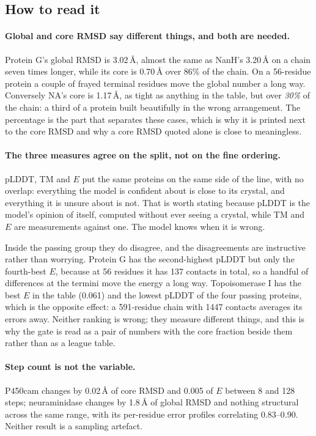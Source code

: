 \documentclass[11pt,a4paper]{article}
\begin{document}
\subsection{How to read it}

\paragraph{Global and core RMSD say different things, and both are needed.}
Protein G's global RMSD is 3.02\,\AA, almost the same as NanH's 3.20\,\AA{} on
a chain seven times longer, while its core is 0.70\,\AA{} over 86\% of the
chain. On a
56-residue protein a couple of frayed terminal residues move the global number a
long way. Conversely NA's core is 1.17\,\AA, as tight as anything in the table,
but over \emph{30\%} of the chain: a third of a protein built beautifully in the
wrong arrangement. The percentage is the part that separates these cases, which
is why it is printed next to the core RMSD and why a core RMSD quoted alone is
close to meaningless.

\paragraph{The three measures agree on the split, not on the fine ordering.}
pLDDT, TM and $E$ put the same proteins on the same side of the line, with no
overlap: everything the model is confident about is close to its crystal, and
everything it is unsure about is not. That is worth stating because pLDDT is the
model's opinion of itself, computed without ever seeing a crystal, while TM and
$E$ are measurements against one. The model knows when it is wrong.

Inside the passing group they do disagree, and the disagreements are
instructive rather than worrying. Protein G has the second-highest pLDDT but
only the fourth-best $E$, because at 56 residues it has 137 contacts in total,
so a handful of differences at the termini move the energy a long way.
Topoisomerase I has the best $E$ in the table (0.061) and the lowest pLDDT of
the four passing proteins, which is the opposite effect: a 591-residue chain
with 1447 contacts averages its errors away. Neither ranking is wrong; they
measure different things, and this is why the gate is read as a pair of numbers
with the core fraction beside them rather than as a league table.

\paragraph{Step count is not the variable.} P450cam changes by 0.02\,\AA{} of
core RMSD and 0.005 of $E$ between 8 and 128 steps; neuraminidase changes by
1.8\,\AA{} of global RMSD and nothing structural across the same range, with its
per-residue error profiles correlating 0.83--0.90. Neither result is a sampling
artefact.
\end{document}
